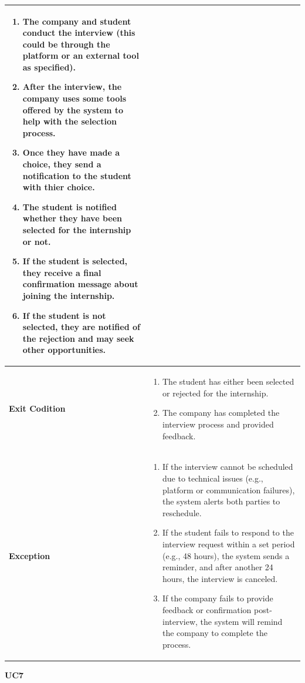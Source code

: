\begin{longtable}{|p{}|p{}|}
\begin{enumerate}
    \item The company and student conduct the interview (this could be through the platform or an external tool as specified).
    \item After the interview, the company uses some tools offered by the system to help with the selection process.
    \item Once they have made a choice, they send a notification to the student with thier choice.
    \item The student is notified whether they have been selected for the internship or not.
    \item If the student is selected, they receive a final confirmation message about joining the internship.
    \item If the student is not selected, they are notified of the rejection and may seek other opportunities.
\end{enumerate} \\
\hline
\textbf{Exit Codition} &  
\begin{enumerate}
    \item The student has either been selected or rejected for the internship.
    \item The company has completed the interview process and provided feedback.
\end{enumerate}\\
\hline
\textbf{Exception} &  
\begin{enumerate}
    \item If the interview cannot be scheduled due to technical issues (e.g., platform or communication failures), the system alerts both parties to reschedule.
    \item If the student fails to respond to the interview request within a set period (e.g., 48 hours), the system sends a reminder, and after another 24 hours, the interview is canceled.
    \item If the company fails to provide feedback or confirmation post-interview, the system will remind the company to complete the process.
\end{enumerate} \\
\hline
\end{longtable}



\textbf{UC7}


